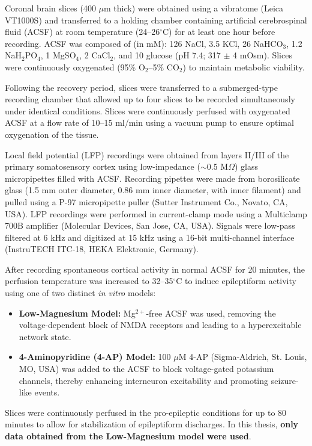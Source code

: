 \documentclass{article}
\begin{document}
Coronal brain slices (400 $\mu$m thick) were obtained using a vibratome (Leica VT1000S) and transferred to a holding chamber containing artificial cerebrospinal fluid (ACSF) at room temperature (24--26$^{\circ}$C) for at least one hour before recording. ACSF was composed of (in mM): 126 NaCl, 3.5 KCl, 26 NaHCO$_3$, 1.2 NaH$_2$PO$_4$, 1 MgSO$_4$, 2 CaCl$_2$, and 10 glucose (pH 7.4; 317 $\pm$ 4 mOsm). Slices were continuously oxygenated (95\% O$_2$--5\% CO$_2$) to maintain metabolic viability.

Following the recovery period, slices were transferred to a submerged-type recording chamber that allowed up to four slices to be recorded simultaneously under identical conditions. Slices were continuously perfused with oxygenated ACSF at a flow rate of 10--15 ml/min using a vacuum pump to ensure optimal oxygenation of the tissue.

Local field potential (LFP) recordings were obtained from layers II/III of the primary somatosensory cortex using low-impedance ($\sim$0.5 M$\Omega$) glass micropipettes filled with ACSF. Recording pipettes were made from borosilicate glass (1.5 mm outer diameter, 0.86 mm inner diameter, with inner filament) and pulled using a P-97 micropipette puller (Sutter Instrument Co., Novato, CA, USA). LFP recordings were performed in current-clamp mode using a Multiclamp 700B amplifier (Molecular Devices, San Jose, CA, USA). Signals were low-pass filtered at 6 kHz and digitized at 15 kHz using a 16-bit multi-channel interface (InstruTECH ITC-18, HEKA Elektronic, Germany).

After recording spontaneous cortical activity in normal ACSF for 20 minutes, the perfusion temperature was increased to 32--35$^{\circ}$C to induce epileptiform activity using one of two distinct \textit{in vitro} models:

\begin{itemize}
    \item \textbf{Low-Magnesium Model:} Mg$^{2+}$-free ACSF was used, removing the voltage-dependent block of NMDA receptors and leading to a hyperexcitable network state.
    \item \textbf{4-Aminopyridine (4-AP) Model:} 100 $\mu$M 4-AP (Sigma-Aldrich, St. Louis, MO, USA) was added to the ACSF to block voltage-gated potassium channels, thereby enhancing interneuron excitability and promoting seizure-like events.
\end{itemize}

Slices were continuously perfused in the pro-epileptic conditions for up to 80 minutes to allow for stabilization of epileptiform discharges. In this thesis, \textbf{only data obtained from the Low-Magnesium model were used}.
\end{document}

